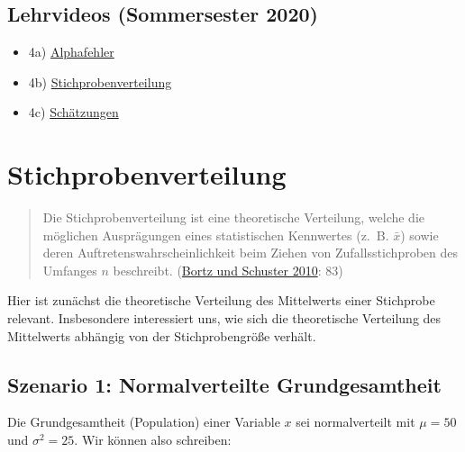 \documentclass[
  11pt,
  ngerman,
  a4paper,
]{report}
\providecommand{\tightlist}{%
  \setlength{\itemsep}{0pt}\setlength{\parskip}{0pt}}
\begin{document}
\hypertarget{lehrvideos-sommersester-2020}{%
\subsection*{Lehrvideos (Sommersester 2020)}\label{lehrvideos-sommersester-2020}}

\begin{itemize}
\tightlist
\item
  4a) \href{https://video01.uni-frankfurt.de/Mediasite/Play/7f5b3002871a4b18859db90d937e5f8a1d}{Alphafehler}
\item
  4b) \href{https://video01.uni-frankfurt.de/Mediasite/Play/393be1f574c643f9a045a6b4cc60a4511d}{Stichprobenverteilung}
\item
  4c) \href{https://video01.uni-frankfurt.de/Mediasite/Play/ace60129a0c94894a66349f56e0b24a31d}{Schätzungen}
\end{itemize}

\hypertarget{stichprobenverteilung}{%
\section{Stichprobenverteilung}\label{stichprobenverteilung}}

\begin{quote}
Die Stichprobenverteilung ist eine theoretische Verteilung, welche die möglichen Ausprägungen eines statistischen Kennwertes (z.~B. \(\bar{x}\)) sowie deren Auftretenswahrscheinlichkeit beim Ziehen von Zufallsstichproben des Umfanges \(n\) beschreibt. (\protect\hyperlink{ref-bortz}{Bortz und Schuster 2010}: 83)
\end{quote}

Hier ist zunächst die theoretische Verteilung des Mittelwerts einer Stichprobe relevant. Insbesondere interessiert uns, wie sich die theoretische Verteilung des Mittelwerts abhängig von der Stichprobengröße verhält.

\hypertarget{szenario-1-normalverteilte-grundgesamtheit}{%
\subsection{Szenario 1: Normalverteilte Grundgesamtheit}\label{szenario-1-normalverteilte-grundgesamtheit}}

Die Grundgesamtheit (Population) einer Variable \(x\) sei normalverteilt mit \(\mu=50\) und \(\sigma^2=25\). Wir können also schreiben:

\nopagebreak
\end{document}
